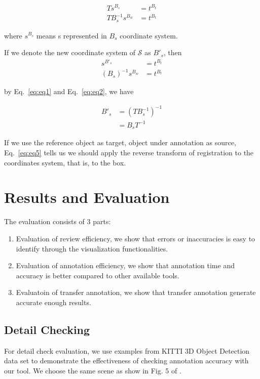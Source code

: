 \documentclass[letterpaper, 10 pt, conference]{ieeeconf}  %
\begin{document}
\begin{align}
T s^{B_s} &= t^{B_t}\\
T B_s^{-1}s^{B_w} &= t^{B_t} \label{eq:eq1}
\end{align}

where $s^{B_s}$ means s represented in $B_s$ coordinate system.

If we denote the new coordinate system of $\mathcal{S}$ as $B'_s$, then
\begin{align} 
s^{B'_s} &= t^{B_t}\\
(B_s)^{-1}s^{B_w} &= t^{B_t} \label{eq:eq2}
\end{align}


by Eq.~\eqref{eq:eq1} and Eq.~\eqref{eq:eq2}, we have

\begin{align}
{B'_s} & = (T B_s^{-1})^{-1}\\
       & = B_s T^{-1} \label{eq:eq5}
\end{align}

If we use the reference object as target, object under annotation as source, Eq.~\eqref{eq:eq5} tells us we should apply the reverse transform of registration to the coordinates system, that is, to the box.



\section{Results and Evaluation}
\label {Metrics}

The evaluation consists of 3 parts:
\begin{enumerate}
	\item Evaluation of review efficiency, we show that errors or inaccuracies is easy to identify through the visualization functionalities.
	\item Evaluation of annotation efficiency, we show that annotation time and accuracy is better compared to other available tools.
	\item Evaluatoin of transfer annotation, we show that transfer annotation generate accurate enough results.
\end{enumerate}

\subsection{Detail Checking}
For detail check evaluation, we use examples from KITTI 3D Object Detection data \cite{Geiger2012CVPR} set to demonstrate the effectiveness of checking annotation accuracy with our tool. We choose the same scene as show in  Fig. 5 of \cite{pointatme}.
\end{document}
